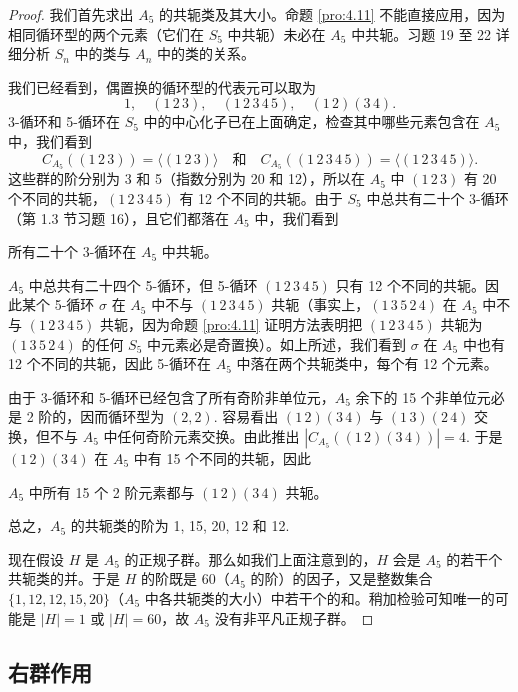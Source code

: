 \begin{proof}
我们首先求出 \(A_5\) 的共轭类及其大小。命题 \ref{pro:4.11} 不能直接应用，因为相同循环型的两个元素（它们在 \(S_5\) 中共轭）未必在 \(A_5\) 中共轭。习题 19 至 22 详细分析 \(S_n\) 中的类与 \(A_n\) 中的类的关系。

我们已经看到，偶置换的循环型的代表元可以取为
\[
1,\quad (1\,2\,3),\quad (1\,2\,3\,4\,5),\quad (1\,2)(3\,4).
\]
3-循环和 5-循环在 \(S_5\) 中的中心化子已在上面确定，检查其中哪些元素包含在 \(A_5\) 中，我们看到
\[
C_{A_5}((1\,2\,3)) = \langle (1\,2\,3) \rangle \quad \text{和} \quad C_{A_5}((1\,2\,3\,4\,5)) = \langle (1\,2\,3\,4\,5) \rangle.
\]
这些群的阶分别为 3 和 5（指数分别为 20 和 12），所以在 \(A_5\) 中 \((1\,2\,3)\) 有 20 个不同的共轭，\((1\,2\,3\,4\,5)\) 有 12 个不同的共轭。由于 \(S_5\) 中总共有二十个 3-循环（第 1.3 节习题 16），且它们都落在 \(A_5\) 中，我们看到
\begin{center}
所有二十个 3-循环在 \(A_5\) 中共轭。
\end{center}
\(A_5\) 中总共有二十四个 5-循环，但 5-循环 \((1\,2\,3\,4\,5)\) 只有 12 个不同的共轭。因此某个 5-循环 \(\sigma\) 在 \(A_5\) 中不与 \((1\,2\,3\,4\,5)\) 共轭（事实上，\((1\,3\,5\,2\,4)\) 在 \(A_5\) 中不与 \((1\,2\,3\,4\,5)\) 共轭，因为命题 \ref{pro:4.11} 证明方法表明把 \((1\,2\,3\,4\,5)\) 共轭为 \((1\,3\,5\,2\,4)\) 的任何 \(S_5\) 中元素必是奇置换）。如上所述，我们看到 \(\sigma\) 在 \(A_5\) 中也有 12 个不同的共轭，因此 5-循环在 \(A_5\) 中落在两个共轭类中，每个有 12 个元素。

由于 3-循环和 5-循环已经包含了所有奇阶非单位元，\(A_5\) 余下的 15 个非单位元必是 2 阶的，因而循环型为 \((2,2)\). 容易看出 \((1\,2)(3\,4)\) 与 \((1\,3)(2\,4)\) 交换，但不与 \(A_5\) 中任何奇阶元素交换。由此推出 \(|C_{A_5}((1\,2)(3\,4))| = 4\). 于是 \((1\,2)(3\,4)\) 在 \(A_5\) 中有 15 个不同的共轭，因此
\begin{center}
\(A_5\) 中所有 15 个 2 阶元素都与 \((1\,2)(3\,4)\) 共轭。
\end{center}
总之，\(A_5\) 的共轭类的阶为 1, 15, 20, 12 和 12.

现在假设 \(H\) 是 \(A_5\) 的正规子群。那么如我们上面注意到的，\(H\) 会是 \(A_5\) 的若干个共轭类的并。于是 \(H\) 的阶既是 60（\(A_5\) 的阶）的因子，又是整数集合 \(\{1, 12, 12, 15, 20\}\)（\(A_5\) 中各共轭类的大小）中若干个的和。稍加检验可知唯一的可能是 \(|H| = 1\) 或 \(|H| = 60\)，故 \(A_5\) 没有非平凡正规子群。
\end{proof}

\subsection*{右群作用}

